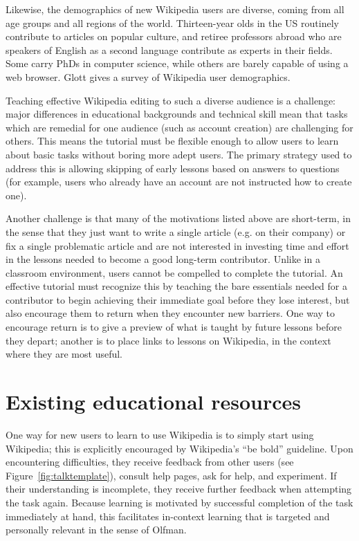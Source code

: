 \documentclass{acm_proc_article-sp}
\begin{document}
Likewise, the demographics of new Wikipedia users are diverse, coming from all age groups and all regions of the world. Thirteen-year olds in the US routinely contribute to articles on popular culture, and retiree professors abroad who are speakers of English as a second language contribute as experts in their fields. Some carry PhDs in computer science, while others are barely capable of using a web browser. Glott\cite{Glott:2010} gives a survey of Wikipedia user demographics.

Teaching effective Wikipedia editing to such a diverse audience is a challenge: major differences in educational backgrounds and technical skill mean that tasks which are remedial for one audience (such as account creation) are challenging for others. This means the tutorial must be flexible enough to allow users to learn about basic tasks without boring more adept users. The primary strategy used to address this is allowing skipping of early lessons based on answers to questions (for example, users who already have an account are not instructed how to create one).

Another challenge is that many of the motivations listed above are short-term, in the sense that they just want to write a single article (e.g. on their company) or fix a single problematic article and are not interested in investing time and effort in the lessons needed to become a good long-term contributor. Unlike in a classroom environment, users cannot be compelled to complete the tutorial. An effective tutorial must recognize this by teaching the bare essentials needed for a contributor to begin achieving their immediate goal before they lose interest, but also encourage them to return when they encounter new barriers. One way to encourage return is to give a preview of what is taught by future lessons before they depart; another is to place links to lessons on Wikipedia, in the context where they are most useful.

\section{Existing educational resources}

One way for new users to learn to use Wikipedia is to simply start using Wikipedia; this is explicitly encouraged by Wikipedia's ``be bold'' guideline. Upon encountering difficulties, they receive feedback from other users (see Figure~\ref{fig:talktemplate}), consult help pages, ask for help, and experiment. If their understanding is incomplete, they receive further feedback when attempting the task again. Because learning is motivated by successful completion of the task immediately at hand, this facilitates in-context learning that is targeted and personally relevant in the sense of Olfman.\cite{Olfman:1991}
\end{document}

